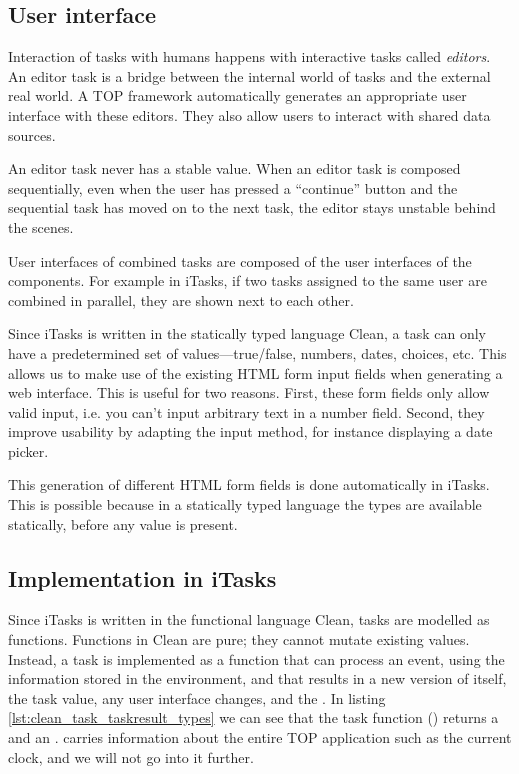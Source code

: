 \subsection{User interface}
Interaction of tasks with humans happens with interactive tasks called \textit{editors}. An editor task is a bridge between the internal world of tasks and the external real world.
A TOP framework automatically generates an appropriate user interface with these editors. They also allow users to interact with shared data sources.

An editor task never has a stable value. When an editor task is composed sequentially, even when the user has pressed a ``continue'' button and the sequential task has moved on to the next task, the editor stays unstable behind the scenes.

User interfaces of combined tasks are composed of the user interfaces of the components. For example in iTasks, if two tasks assigned to the same user are combined in parallel, they are shown next to each other. \cite[\S 4.2.4]{naus2020assisting}

Since iTasks is written in the statically typed language Clean, a task can only have a predetermined set of values---true/false, numbers, dates, choices, etc. This allows us to make use of the existing HTML form input fields when generating a web interface. This is useful for two reasons. First, these form fields only allow valid input, i.e. you can't input arbitrary text in a number field. Second, they improve usability by adapting the input method, for instance displaying a date picker.

This generation of different HTML form fields is done automatically in iTasks. This is possible because in a statically typed language the types are available statically, before any value is present.

\subsection{Implementation in iTasks}
Since iTasks is written in the functional language Clean, tasks are modelled as functions. Functions in Clean are pure; they cannot mutate existing values. Instead, a task is implemented as a function that can process an event, using the information stored in the  environment, and that results in a new version of itself, the task value, any user interface changes, and the .
In listing \ref{lst:clean_task_taskresult_types} we can see that the task function () returns a  and an .  carries information about the entire TOP application such as the current clock, and we will not go into it further.

